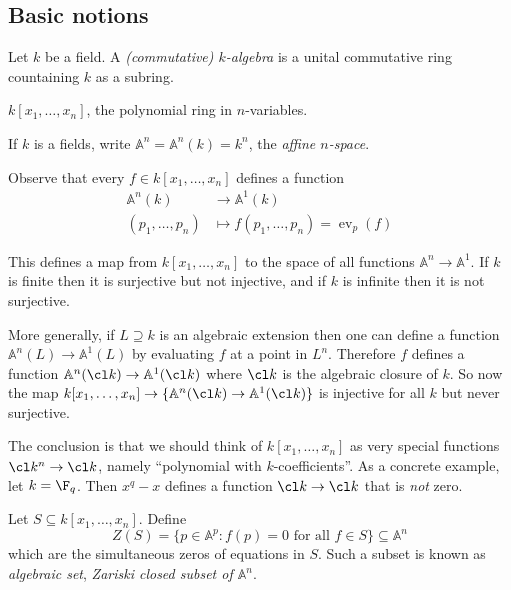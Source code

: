 \documentclass[a4paper]{article}
\renewcommand{\A}{\mathbb{A}}
\begin{document}
\subsection{Basic notions}

\begin{definition}[\(k\)-algebra]
  Let \(k\) be a field. A \emph{(commutative) \(k\)-algebra} is a unital commutative ring countaining \(k\) as a subring.
\end{definition}

\begin{eg}
  \(k[x_1, \dots, x_n]\), the polynomial ring in \(n\)-variables.
\end{eg}

\begin{notation}
  If \(k\) is a fields, write \(\A^n = \A^n(k) = k^n\), the \emph{affine \(n\)-space}.
\end{notation}

Observe that every \(f \in k[x_1, \dots, x_n]\) defines a function
\begin{align*}
  \A^n(k) &\to \A^1(k) \\
  (p_1, \dots, p_n) &\mapsto f(p_1, \dots, p_n) = \operatorname{ev}_p(f)
\end{align*}

This defines a map from \(k[x_1, \dots, x_n]\) to the space of all functions \(\A^n \to \A^1\). If \(k\) is finite then it is surjective but not injective, and if \(k\) is infinite then it is not surjective.

More generally, if \(L \supseteq k\) is an algebraic extension then one can define a function \(\A^n(L) \to \A^1(L)\) by evaluating \(f\) at a point in \(L^n\). Therefore \(f\) defines a function \(\A^n(\cl k) \to \A^1(\cl k)\) where \(\cl k\) is the algebraic closure of \(k\). So now the map \(k[x_1, \dots, x_n] \to \{\A^n(\cl k) \to \A^1(\cl k)\}\) is injective for all \(k\) but never surjective.

The conclusion is that we should think of \(k[x_1, \dots, x_n]\) as very special functions \(\cl k^n \to \cl k\), namely ``polynomial with \(k\)-coefficients''. As a concrete example, let \(k = \F_q\). Then \(x^q - x\) defines a function \(\cl k \to \cl k\) that is \emph{not} zero.

\begin{definition}
  Let \(S \subseteq k[x_1, \dots, x_n]\). Define
  \[
    Z(S) = \{p \in \A^p: f(p) = 0 \text{ for all } f \in S\} \subseteq \A^n
  \]
  which are the simultaneous zeros of equations in \(S\). Such a subset is known as \emph{algebraic set}, \emph{Zariski closed subset of \(\A^n\)}.
\end{definition}
\end{document}
